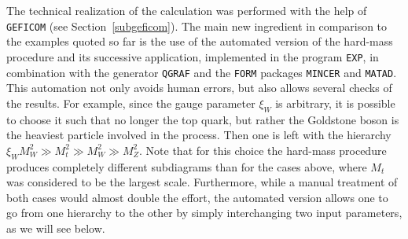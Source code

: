 The technical realization of the calculation was performed with the help
of {\tt GEFICOM} (see Section~\ref{subgeficom}). The main new ingredient
in comparison to the examples quoted so far is the use of the automated
version of the hard-mass procedure and its successive application,
implemented in the program {\tt EXP}, in combination with the generator
{\tt QGRAF} and the {\tt FORM} packages {\tt MINCER} and {\tt MATAD}.
This automation not only avoids human errors, but also allows several
checks of the results. For example, since the gauge parameter $\xi_W$ is
arbitrary, it is possible to choose it such that no longer the top
quark, but rather the Goldstone boson is the heaviest particle involved
in the process. Then one is left with the hierarchy $\xi_W M_W^2\gg
M_t^2 \gg M_W^2\gg M_Z^2$.  Note that for this choice the hard-mass
procedure produces completely different subdiagrams than for the cases
above, where $M_t$ was considered to be the largest scale.  Furthermore,
while a manual treatment of both cases would almost double the effort,
the automated version allows one to go from one hierarchy to the other by
simply interchanging two input parameters, as we will see below.

